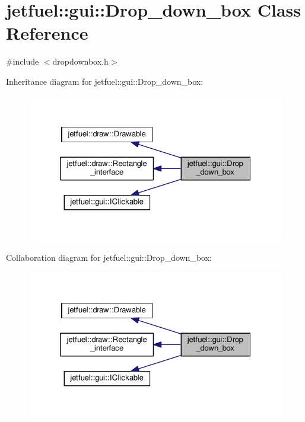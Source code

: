 \hypertarget{classjetfuel_1_1gui_1_1Drop__down__box}{}\section{jetfuel\+:\+:gui\+:\+:Drop\+\_\+down\+\_\+box Class Reference}
\label{classjetfuel_1_1gui_1_1Drop__down__box}


{\ttfamily \#include $<$dropdownbox.\+h$>$}



Inheritance diagram for jetfuel\+:\+:gui\+:\+:Drop\+\_\+down\+\_\+box\+:
\nopagebreak
\begin{figure}[H]
\begin{center}
\leavevmode
\includegraphics[width=325pt]{classjetfuel_1_1gui_1_1Drop__down__box__inherit__graph}
\end{center}
\end{figure}


Collaboration diagram for jetfuel\+:\+:gui\+:\+:Drop\+\_\+down\+\_\+box\+:
\nopagebreak
\begin{figure}[H]
\begin{center}
\leavevmode
\includegraphics[width=325pt]{classjetfuel_1_1gui_1_1Drop__down__box__coll__graph}
\end{center}
\end{figure}
